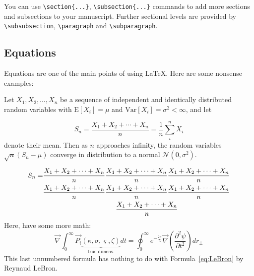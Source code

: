 \documentclass[draft]{OCR}
\begin{document}
You can use \verb|\section{...}|, \verb|\subsection{...}| commands to add more sections and
subsections to your manuscript. Further sectional levels are provided by \verb|\subsubsection|,
\verb|\paragraph| and \verb|\subparagraph|.

\subsection{Equations}

Equations are one of the main points of using \LaTeX. Here are some nonsense examples:

Let $X_1, X_2, \ldots, X_n$ be a sequence of independent and identically distributed random
variables with $\text{E}[X_i] = \mu$ and $\text{Var}[X_i] = \sigma^2 < \infty$, and let
%

\begin{equation}\label{eq:LeBron}
S_n = \frac{X_1 + X_2 + \cdots + X_n}{n}
      = \frac{1}{n}\sum_{i}^{n} X_i
\end{equation}
%
denote their mean. Then as $n$ approaches infinity, the random variables $\sqrt{n}(S_n - \mu)$
converge in distribution to a normal $\mathcal{N}(0, \sigma^2)$.

\begin{eqnarray}
  S_n = & \frac{X_1 + X_2 + \cdots + X_n}{n}
  \frac{X_1 + X_2 + \cdots + X_n}{n}
  \frac{X_1 + X_2 + \cdots + X_n}{n} \nonumber\\
  & \frac{X_1 + X_2 + \cdots + X_n}{n}
  \frac{X_1 + X_2 + \cdots + X_n}{n}
    \frac{X_1 + X_2 + \cdots + X_n}{n}\nonumber\\
        & \hspace{10.5em}\frac{X_1 + X_2 + \cdots + X_n}{n}
\end{eqnarray}
Here, have some more math:
\[ \vec{\nabla}\int_0^\infty\vec{P_i}\underbrace{(\kappa,\sigma,\varsigma, \zeta)}_{\text{true
      dimens.}}dt = \oint_0^\infty
  e^{\textstyle-\frac{2\pi}{\lambda}}\vec{\nabla}\left(\frac{\partial^2\psi}{\partial
      t^2}\right)dr_\perp\]
This last unnumbered formula has nothing to do with Formula~\ref{eq:LeBron} by Reynaud LeBron.
\end{document}
